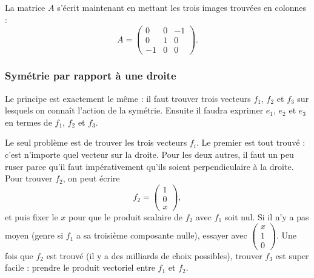 La matrice \( A\) s'écrit maintenant en mettant les trois images trouvées en colonnes :
\begin{equation}
	A=\begin{pmatrix}
		0  & 0 & -1 \\
		0  & 1 & 0  \\
		-1 & 0 & 0
	\end{pmatrix}.
\end{equation}

\subsubsection{Symétrie par rapport à une droite}

Le principe est exactement le même : il faut trouver trois vecteurs \( f_1\), \( f_2\) et \( f_3\) sur lesquels on connaît l'action de la symétrie. Ensuite il faudra exprimer \( e_1\), \( e_2\) et \( e_3\) en termes de \( f_1\), \( f_2\) et \( f_3\).

Le seul problème est de trouver les trois vecteurs \( f_i\). Le premier est tout trouvé : c'est n'importe quel vecteur sur la droite. Pour les deux autres, il faut un peu ruser parce qu'il faut impérativement qu'ils soient perpendiculaire à la droite. Pour trouver \( f_2\), on peut écrire
\begin{equation}
	f_2=\begin{pmatrix}
		1 \\
		0 \\
		x
	\end{pmatrix},
\end{equation}
et puis fixer le \( x\) pour que le produit scalaire de \( f_2\) avec \( f_1\) soit nul. Si il n'y a pas moyen (genre si \( f_1\) a sa troisième composante nulle), essayer avec \( \begin{pmatrix}
	x \\
	1 \\
	0
\end{pmatrix}\). Une fois que \( f_2\) est trouvé (il y a des milliards de choix possibles), trouver \( f_3\) est super facile : prendre le produit vectoriel entre \( f_1\) et \( f_2\).

